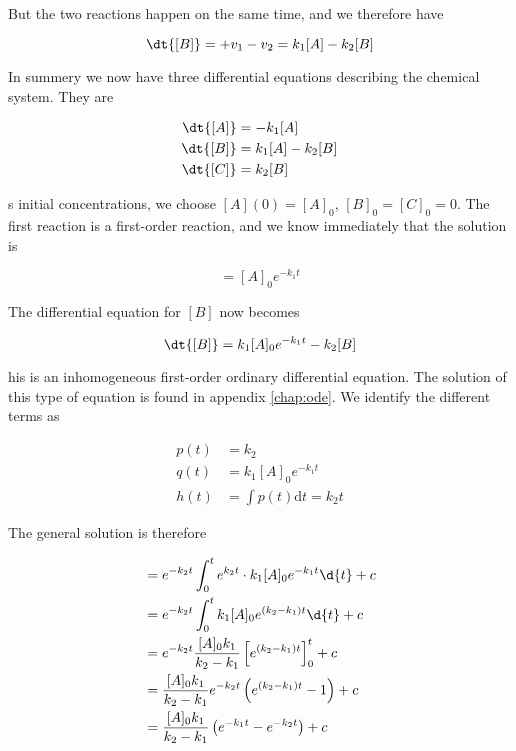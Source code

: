 But the two reactions happen on the same time, and we therefore have

\begin{equation}
    \dt{[B]} = +v_1 - v_2 = k_1[A] - k_2[B]
\end{equation}

In summery we now have three differential equations describing the chemical system. They are

\begin{align*}
    \dt{[A]} &= -k_1[A] \\
    \dt{[B]} &= k_1[A] - k_2[B] \\
    \dt{[C]} &= k_2[B]
\end{align*}

s initial concentrations, we choose $[A](0) = [A]_0$, $[B]_0 = [C]_0 = 0$. The first reaction is a first-order reaction, and we know immediately that the solution is

\begin{equation}
    [A] = [A]_0e^{-k_1t}
\end{equation}

The differential equation for $[B]$ now becomes

\begin{equation}
    \dt{[B]} = k_1[A]_0e^{-k_1t} - k_2[B]
\end{equation}

his is an inhomogeneous first-order ordinary differential equation. The solution of this type of equation is found in appendix \ref{chap:ode}. We identify the different terms as

\begin{align*}
    p(t) &= k_2 \\
    q(t) &= k_1[A]_0e^{-k_1t} \\
    h(t) &= \int p(t) \mathrm{d}t = k_2 t
\end{align*}

The general solution is therefore

\begin{align}
    [B] &= e^{-k_2t} \int_0^t e^{k_2t} \cdot k_1[A]_0e^{-k_1t}\d{t} + c \nonumber \\
        &= e^{-k_2t} \int_0^t k_1[A]_0e^{(k_2-k_1)t}\d{t} + c \nonumber \\
        &= e^{-k_2t}\frac{[A]_0k_1}{k_2-k_1}\left[ e^{(k_2-k_1)t} \right]_0^t + c \nonumber \\
        &= \frac{[A]_0k_1}{k_2-k_1}e^{-k_2t} \left( e^{(k_2-k_1)t} - 1 \right) + c \nonumber \\
        &= \frac{[A]_0k_1}{k_2-k_1} \left( e^{-k_1t} - e^{-k_2 t} \right) + c \label{eq:TwoFirstOrderSolution}
\end{align}

